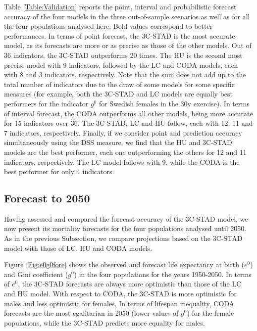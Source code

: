 \documentclass[11pt, a4paper]{article}
\begin{document}
Table \ref{Table:Validation} reports the point, interval and {\color{red}probabilistic} forecast accuracy of the four models in the three out-of-sample scenarios as well as for all the four populations analysed here. Bold values correspond to better performances. In terms of point forecast, the 3C-STAD is the most accurate model, as its forecasts are more or as precise as those of the other models. Out of 36 indicators, the 3C-STAD outperforms 20 times. The HU is the second most precise model with {\color{red}9} indicators, followed by the LC and CODA models, each with {\color{red}8} and 3 indicators, respectively. Note that the sum does not add up to the total number of indicators due to the draw of some models for some specific measures {\color{red}(for example, both the 3C-STAD and LC models are equally best performers for the indicator $g^0$ for Swedish females in the 30y exercise)}. In terms of interval forecast, the CODA outperforms all other models, being more accurate for 15 indicators over 36. The 3C-STAD, {\color{red}LC} and HU follow, each with {\color{red}12, 11 and 7} indicators, respectively. {\color{red}Finally, if we consider point and prediction accuracy simultaneously using the DSS measure, we find that the HU and 3C-STAD models are the best performer, each one outperforming the others for 12 and 11 indicators, respectively. The LC model follows with 9, while the CODA is the best performer for only 4 indicators.} 


\subsection{Forecast to 2050}\label{Subsec:Forecast2050}

Having assessed and compared the forecast accuracy of the 3C-STAD model, we now present its mortality forecasts for the four populations analysed until 2050. As in the previous Subsection, we compare projections based on the 3C-STAD model with those of LC, HU and CODA models.

Figure \ref{Fig:e0g0fore} shows the observed and forecast life expectancy at birth ($e^{0}$) and Gini coefficient ($g^{0}$) in the four populations for the years 1950-2050. In terms of $e^{0}$, the 3C-STAD forecasts are always more optimistic than those of the LC and HU model. With respect to CODA, the 3C-STAD is more optimistic for males and less optimistic for females. In terms of lifespan inequality, CODA forecasts are the most egalitarian in 2050 (lower values of $g^{0}$) for the female populations, while the 3C-STAD predicts more equality for males.
\end{document}
